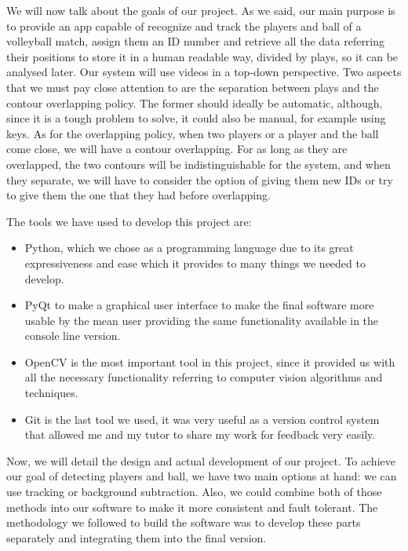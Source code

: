 We will now talk about the goals of our project. As we said, our main purpose is to provide an app capable of recognize and track the players and ball of a volleyball match, assign them an ID number and retrieve all the data referring their positions to store it in a human readable way, divided by plays, so it can be analysed later. Our system will use videos in a top-down perspective. Two aspects that we must pay close attention to are the separation between plays and the contour overlapping policy. The former should ideally be automatic, although, since it is a tough problem to solve, it could also be manual, for example using keys. As for the overlapping policy, when two players or a player and the ball come close, we will have a contour overlapping. For as long as they are overlapped, the two contours will be indistinguishable for the system, and when they separate, we will have to consider the option of giving them new IDs or try to give them the one that they had before overlapping. 

The tools we have used to develop this project are: 
\begin{itemize}
    \item Python, which we chose as a programming language due to its great expressiveness and ease which it provides to many things we needed to develop.
    \item PyQt to make a graphical user interface to make the final software more usable by the mean user providing the same functionality available in the console line version.
    \item OpenCV is the most important tool in this project, since it provided us with all the necessary functionality referring to computer vision algorithms and techniques.  
    \item Git is the last tool we used, it was very useful as a version control system that allowed me and my tutor to share my work for feedback very easily.
\end{itemize}

Now, we will detail the design and actual development of our project. To achieve our goal of detecting players and ball, we have two main options at hand: we can use tracking or background subtraction. Also, we could combine both of those methods into our software to make it more consistent and fault tolerant. The methodology we followed to build the software was to develop these parts separately and integrating them into the final version.

